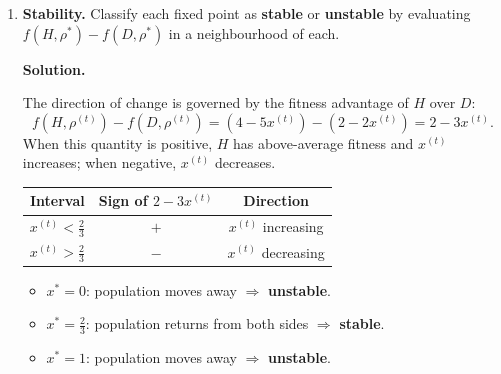 \documentclass[12pt]{article}
\newenvironment{solution}{%
  \ifshowsolutions\begin{solutionbox}\noindent\textbf{\color{blue!70!black}Solution.}\quad\fi
  \ifshowsolutions\else\expandafter\comment\fi
}{%
  \ifshowsolutions\end{solutionbox}\fi
  \ifshowsolutions\else\expandafter\endcomment\fi
}
\begin{document}
\begin{enumerate}
  \begin{solution}
    At a fixed point, the proportional replication update leaves the distribution unchanged, which requires each action's fitness to equal the population fitness:
    \[
      f(a, \rho^*) = \bar{f}(\rho^*) \quad \text{for all } a \text{ with } \rho^*(a) > 0.
    \]
    If $x^* = 0$ or $x^* = 1$, the population is monomorphic and trivially fixed. For an interior fixed point, we require $f(H,\rho^*)= f(D,\rho^*)$:
    \begin{align*}
      -x^* + 4(1-x^*) &= 2(1-x^*)\\
      4 - 5x^* &= 2 - 2x^*\\
      x^* &= \tfrac{2}{3}.
    \end{align*}
    The three fixed points are $x^* \in \left\{0,\;\tfrac{2}{3},\;1\right\}$.
  \end{solution}

  \item \textbf{Stability.} Classify each fixed point as \textbf{stable} or \textbf{unstable} by evaluating $f(H,\rho^*) - f(D,\rho^*)$ in a neighbourhood of each.

  \begin{solution}
    The direction of change is governed by the fitness advantage of $H$ over $D$:
    \[
      f(H,\rho^{(t)}) - f(D,\rho^{(t)}) = (4-5x^{(t)}) - (2-2x^{(t)}) = 2 - 3x^{(t)}.
    \]
    When this quantity is positive, $H$ has above-average fitness and $x^{(t)}$ increases; when negative, $x^{(t)}$ decreases.
    \begin{center}
    \begin{tabular}{ccc}
      Interval & Sign of $2-3x^{(t)}$ & Direction \\\hline
      $x^{(t)} < \tfrac{2}{3}$ & $+$ & $x^{(t)}$ increasing \\
      $x^{(t)} > \tfrac{2}{3}$ & $-$ & $x^{(t)}$ decreasing
    \end{tabular}
    \end{center}
    \begin{itemize}
      \item $x^*=0$: population moves away $\Rightarrow$ \textbf{unstable}.
      \item $x^*=\tfrac{2}{3}$: population returns from both sides $\Rightarrow$ \textbf{stable}.
      \item $x^*=1$: population moves away $\Rightarrow$ \textbf{unstable}.
    \end{itemize}
  \end{solution}


\end{enumerate}
\end{document}
